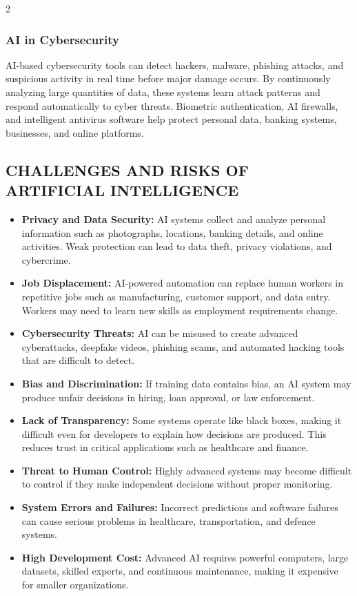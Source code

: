 \begin{multicols}{2}
  \subsubsection*{AI in Cybersecurity}
  AI-based cybersecurity tools can detect hackers, malware, phishing attacks, and suspicious activity in real time before major damage occurs. By continuously analyzing large quantities of data, these systems learn attack patterns and respond automatically to cyber threats. Biometric authentication, AI firewalls, and intelligent antivirus software help protect personal data, banking systems, businesses, and online platforms.

  \subsection*{\centering\uppercase{Challenges and Risks of Artificial Intelligence}}
  \begin{itemize}\justifying
    \item \textbf{Privacy and Data Security:} AI systems collect and analyze personal information such as photographs, locations, banking details, and online activities. Weak protection can lead to data theft, privacy violations, and cybercrime.
    \item \textbf{Job Displacement:} AI-powered automation can replace human workers in repetitive jobs such as manufacturing, customer support, and data entry. Workers may need to learn new skills as employment requirements change.
    \item \textbf{Cybersecurity Threats:} AI can be misused to create advanced cyberattacks, deepfake videos, phishing scams, and automated hacking tools that are difficult to detect.
    \item \textbf{Bias and Discrimination:} If training data contains bias, an AI system may produce unfair decisions in hiring, loan approval, or law enforcement.
    \item \textbf{Lack of Transparency:} Some systems operate like black boxes, making it difficult even for developers to explain how decisions are produced. This reduces trust in critical applications such as healthcare and finance.
    \item \textbf{Threat to Human Control:} Highly advanced systems may become difficult to control if they make independent decisions without proper monitoring.
    \item \textbf{System Errors and Failures:} Incorrect predictions and software failures can cause serious problems in healthcare, transportation, and defence systems.
    \item \textbf{High Development Cost:} Advanced AI requires powerful computers, large datasets, skilled experts, and continuous maintenance, making it expensive for smaller organizations.
  \end{itemize}


\end{multicols}
